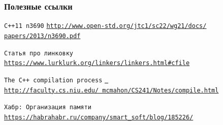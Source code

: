 \documentclass[10pt]{beamer}
\begin{document}
\begin{frame}[allowframebreaks]
  \frametitle<presentation>{Полезные ссылки}
    
  \begin{thebibliography}{10}
{
  \beamertemplatebookbibitems
    
  \texttt{C++11 n3690}
  \newblock \href{http://www.open-std.org/jtc1/sc22/wg21/docs/papers/2013/n3690.pdf}{\texttt{http://www.open-std.org/jtc1/sc22/wg21/docs/\\papers/2013/n3690.pdf}}

  \texttt{Статья про линковку}
  \newblock \href{https://www.lurklurk.org/linkers/linkers.html#cfile}{\texttt{https://www.lurklurk.org/linkers/linkers.html#cfile}}
  
  \texttt{The C++ compilation process}
   \newblock \href{http://faculty.cs.niu.edu/~mcmahon/CS241/Notes/compile.html}{\texttt{ http://faculty.cs.niu.edu/~mcmahon/CS241/Notes/compile.html}}
   
  \texttt{Хабр: Организация памяти}
   \newblock \href{https://habrahabr.ru/company/smart_soft/blog/185226/}{\texttt{https://habrahabr.ru/company/smart_soft/blog/185226/}}
   
  
}
    
  \end{thebibliography}
\end{frame}
\end{document}
